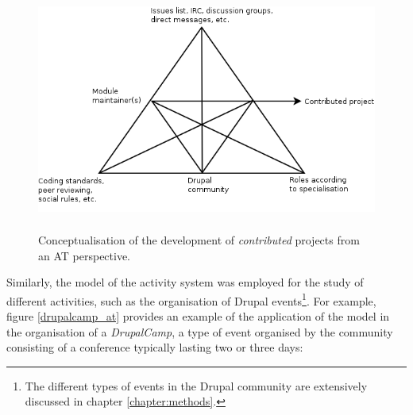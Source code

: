\begin{figure}[H]
	\centering
	\includegraphics[height=8cm]{diagrams/drupal_module_at.png}
	\caption{Conceptualisation of the development of \textit{contributed} projects from an AT perspective.}
	\label{drupal_module_at}
\end{figure}

Similarly, the model of the activity system was employed for the study of different activities, such as the organisation of Drupal events\footnote{The different types of events in the Drupal community are extensively discussed in chapter \ref{chapter:methods}.}. For example, figure \ref{drupalcamp_at} provides an example of the application of the model in the organisation of a \textit{DrupalCamp}, a type of event organised by the community consisting of a conference typically lasting two or three days:

